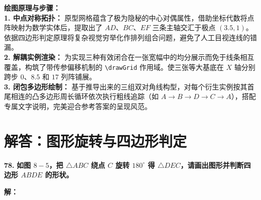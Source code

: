 \documentclass[12pt, a4paper]{ctexrep}
\begin{document}
\vspace{0.4cm}
{\small\color{blue!70!black}
\textbf{绘图原理与步骤：}\\
\textbf{1. 中点对称拓扑：} 原型网格蕴含了极为隐秘的中心对偶属性，借助坐标代数将点阵映射为数学实体后，提取出了 $AD$、$BC$、$EF$ 三条主轴交汇于极点 $(3.5, 1)$。依据四边形判定原理将复杂视觉穷举化作排列组合问题，避免了人工目视连线的错漏。\\
\textbf{2. 解耦实例渲染：} 为实现三种有效闭合在一张宽幅中的均分展示而免于线条相互覆盖，构筑了带传参偏移机制的 \texttt{\textbackslash drawGrid} 作用域。使三张等大基底在 $X$ 轴分别跨步 $0$、$8.5$ 和 $17$ 列阵铺展。\\
\textbf{3. 闭包多边形绘制：} 基于推导出来的三组双对角线构型，对每个衍生实例按其首尾相连的凸多边形周长循环依次执行粗线追踪（如 $A\to B\to D\to C\to A$），搭配专属文字说明，完美迎合参考答案的呈现风范。
}

\newpage

\section{解答：图形旋转与四边形判定}

\vspace{0.6cm}

\textbf{\LARGE 78.} \textbf{如图 $8-5$，把 $\triangle ABC$ 绕点 $C$ 旋转 $180^\circ$ 得 $\triangle DEC$，请画出图形并判断四边形 $ABDE$ 的形状。}

\vspace{0.4cm}
\textbf{解：}
\end{document}
